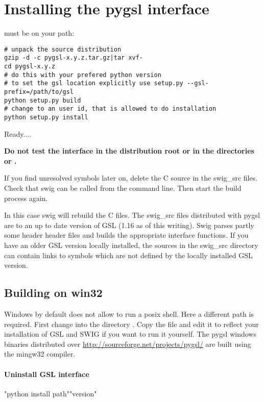 \section{Installing the pygsl interface}

 must be on your path:\nopagebreak
\begin{verbatim}
# unpack the source distribution
gzip -d -c pygsl-x.y.z.tar.gz|tar xvf-
cd pygsl-x.y.z
# do this with your prefered python version
# to set the gsl location explicitly use setup.py --gsl-prefix=/path/to/gsl
python setup.py build
# change to an user id, that is allowed to do installation
python setup.py install
\end{verbatim}
Ready....

{\bf Do not test the interface in the distribution root or in the directories
  or .}

If you find unresolved symbols later on, delete the C source in the
swig_src files. Check that swig can be called from the command line. 
Then start the build process again. 

In this case swig will rebuild the C files. The swig_src files
distributed with pygsl are to an up to date version of GSL (1.16 as of
this writing). Swig parses partly some header header files and builds
the appropriate interface functions. If you have an older GSL version 
locally installed, the sources in the swig_src directory can contain 
links to symbols which are not defined by the locally installed GSL
version.

\subsection{Building on win32}

Windows by default does not allow to run a posix shell. Here a different path
is required. First change into the directory . Copy the file 
and edit it to reflect your installation of GSL and SWIG if you want to run it
yourself. The pygsl windows binaries distributed over 
\url{http://sourceforge.net/projects/pygsl/} are built using the mingw32 
compiler. 

\paragraph*{Uninstall GSL interface}
"python install path""version"

